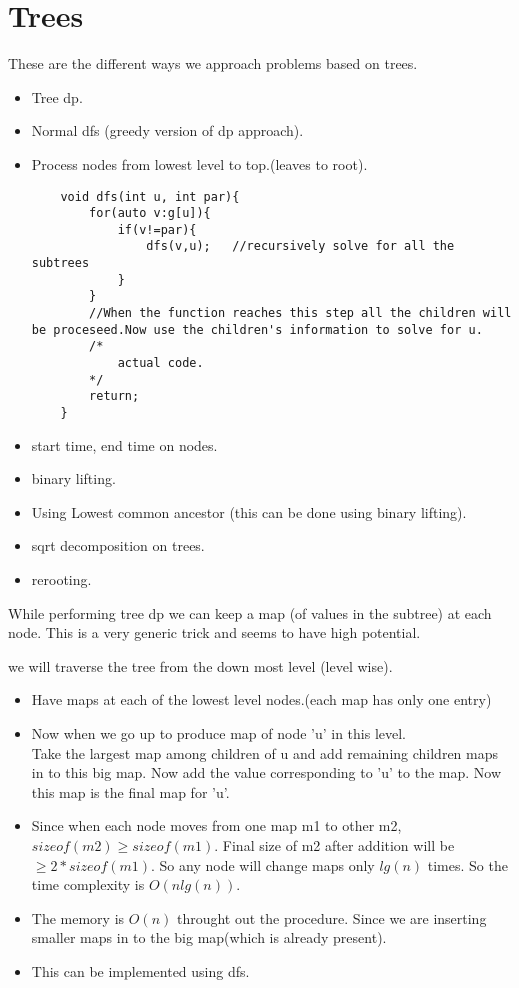 \documentclass[../Notes.tex]{subfiles}
\begin{document}
\section{Trees}

These are the different ways we approach problems based on trees.
\begin{itemize}
	\item Tree dp.
	\item Normal dfs (greedy version of dp approach).
	\item Process nodes from lowest level to top.(leaves to root).
	\begin{lstlisting}
	void dfs(int u, int par){
		for(auto v:g[u]){
			if(v!=par){
				dfs(v,u);	//recursively solve for all the subtrees
			}
		}
		//When the function reaches this step all the children will be proceseed.Now use the children's information to solve for u.
		/*
			actual code.
		*/
		return;
	}
	\end{lstlisting}
	\item start time, end time on nodes.
	\item binary lifting.
	\item Using Lowest common ancestor (this can be done using binary lifting).
	\item sqrt decomposition on trees.
	\item rerooting.
\end{itemize}

While performing tree dp we can keep a map (of values in the subtree) at each node. This is a very generic trick and seems to have high potential.

we will traverse the tree from the down most level (level wise).

\begin{itemize}
	\item Have maps at each of the lowest level nodes.(each map has only one entry)
	\item Now when we go up to produce map of node 'u' in this level.\\
	Take the largest map among children of u and add remaining children maps in to this big map. Now add the value corresponding to 'u' to the map. Now this map is the final map for 'u'.
	\item Since when each node moves from one map m1 to other m2, $sizeof(m2) \geq sizeof(m1)$. Final size of m2 after addition will be $\geq 2*sizeof(m1)$. So any node will change maps only $lg(n)$ times. So the time complexity is $O(nlg(n))$.
	\item The memory is $O(n)$ throught out the procedure. Since we are inserting smaller maps in to the big map(which is already present).
	\item This can be implemented using dfs.
\end{itemize}
\end{document}
